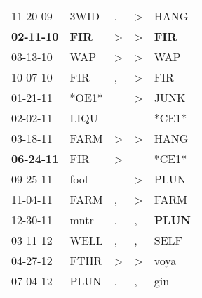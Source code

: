 \begin{supertabular}{p{0.07\textwidth}p{0.06\textwidth}p{0.02\textwidth}p{0.02\textwidth}p{0.06\textwidth}}
          11-20-09\textsuperscript{} &           3WID\textsuperscript{} &             , &     \textgreater &           HANG\textsuperscript{} \\
 \textbf{02-11-10\textsuperscript{}} &   \textbf{FIR\textsuperscript{}} &  \textgreater &     \textgreater &   \textbf{FIR\textsuperscript{}} \\
          03-13-10\textsuperscript{} &            WAP\textsuperscript{} &  \textgreater &     \textgreater &            WAP\textsuperscript{} \\
          10-07-10\textsuperscript{} &            FIR\textsuperscript{} &             , &     \textgreater &            FIR\textsuperscript{} \\
          01-21-11\textsuperscript{} &                            *OE1* &               &     \textgreater &           JUNK\textsuperscript{} \\
          02-02-11\textsuperscript{} &           LIQU\textsuperscript{} &               &                  &                            *CE1* \\
          03-18-11\textsuperscript{} &           FARM\textsuperscript{} &  \textgreater &     \textgreater &           HANG\textsuperscript{} \\
 \textbf{06-24-11\textsuperscript{}} &            FIR\textsuperscript{} &  \textgreater &                  &                            *CE1* \\
          09-25-11\textsuperscript{} &           fool\textsuperscript{} &               &     \textgreater &           PLUN\textsuperscript{} \\
          11-04-11\textsuperscript{} &           FARM\textsuperscript{} &             , &     \textgreater &           FARM\textsuperscript{} \\
          12-30-11\textsuperscript{} &           mntr\textsuperscript{} &             , &                , &  \textbf{PLUN\textsuperscript{}} \\
          03-11-12\textsuperscript{} &           WELL\textsuperscript{} &             , &                , &           SELF\textsuperscript{} \\
          04-27-12\textsuperscript{} &           FTHR\textsuperscript{} &  \textgreater &     \textgreater &           voya\textsuperscript{} \\
          07-04-12\textsuperscript{} &           PLUN\textsuperscript{} &             , &                , &            gin\textsuperscript{} \\

\end{supertabular}
